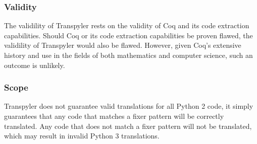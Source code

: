 \subsubsection{Validity}
The validility of Transpyler rests on the validity of Coq and its code extraction capabilities. Should Coq or its code extraction capabilities be proven flawed, the validility of Transpyler would also be flawed. However, given Coq's extensive history and use in the fields of both mathematics and computer science, such an outcome is unlikely.
\subsubsection{Scope}
Transpyler does not guarantee valid translations for all Python 2 code, it simply guarantees that any code that matches a fixer pattern will be correctly translated. Any code that does not match a fixer pattern will not be translated, which may result in invalid Python 3 translations.